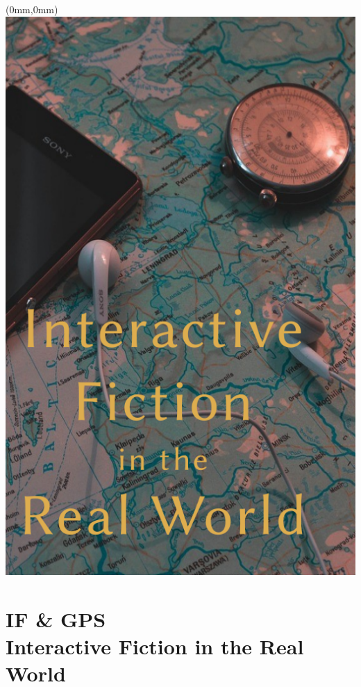 \documentclass[11.75pt,openany,final]{memoir}
\begin{document}
\chapter*{}
\begin{textblock*}{70.9mm}(0mm,0mm)
  \includegraphics[width=\paperwidth]{./media/images/gps_splash}
\end{textblock*}
\clearpage
\chapter{IF \& GPS\\ \small{Interactive Fiction in the Real World}}

\end{document}
